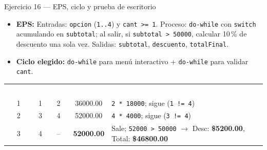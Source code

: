 \documentclass[11pt,letterpaper]{article}
\begin{document}
\begin{solucion}{Ejercicio 16 --- EPS, ciclo y prueba de escritorio}
\begin{itemize}
  \item \textbf{EPS:} Entradas: \texttt{opcion} (\texttt{1..4}) y \texttt{cant >= 1}. Proceso: \texttt{do-while} con \texttt{switch} acumulando en \texttt{subtotal}; al salir, si \texttt{subtotal > 50000}, calcular 10\,\% de descuento una sola vez. Salidas: \texttt{subtotal}, \texttt{descuento}, \texttt{totalFinal}.
  \item \textbf{Ciclo elegido:} \texttt{do-while} para menú interactivo + \texttt{do-while} para validar \texttt{cant}.
\end{itemize}
\begin{center}
\footnotesize
\renewcommand{\arraystretch}{1.15}
\begin{tabularx}{0.9\linewidth}{c c c c X}
\rowcolor{AzulMarino}
\textcolor{white}{\textbf{Turno}} & \textcolor{white}{\texttt{op}} & \textcolor{white}{\texttt{cant}} & \textcolor{white}{\texttt{subtotal}} & \textcolor{white}{\textbf{Detalle}} \\
1 & 1 & 2 & 36000.00 & \texttt{2 * 18000}; sigue (\texttt{1 != 4}) \\
2 & 3 & 4 & 52000.00 & \texttt{4 * 4000}; sigue (\texttt{3 != 4}) \\
3 & 4 & -- & \textbf{52000.00} & Sale; \texttt{52000 > 50000} $\rightarrow$ Desc: \textbf{\$5200.00}, Total: \textbf{\$46800.00} \\
\bottomrule
\end{tabularx}
\end{center}
\end{solucion}
\end{document}
